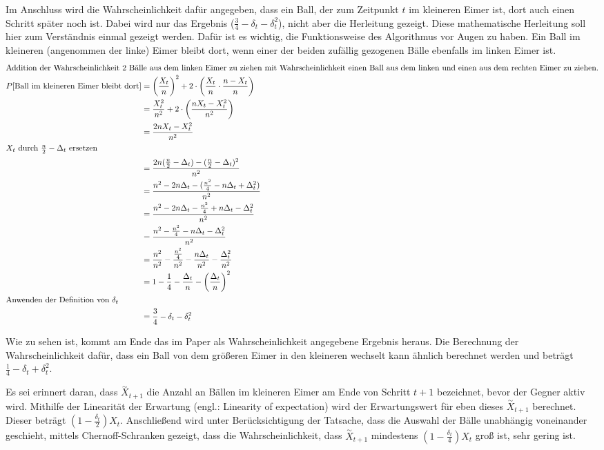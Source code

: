 \documentclass[12pt,ngerman,a4paper]{scrartcl}
\theoremstyle{plain}
\theoremstyle{definition}
\theoremstyle{remark}
\begin{document}
Im Anschluss wird die Wahrscheinlichkeit dafür angegeben, dass ein Ball, der
zum Zeitpunkt $t$ im kleineren Eimer ist, dort auch einen Schritt später noch ist.
Dabei wird nur das Ergebnis ($\frac{3}{4} - \delta_t - \delta_t^2$), nicht aber
die Herleitung gezeigt. Diese mathematische Herleitung soll hier zum Verständnis
einmal gezeigt werden. Dafür ist es wichtig, die Funktionsweise des Algorithmus
vor Augen zu haben. Ein Ball im kleineren (angenommen der linke) Eimer bleibt dort,
wenn einer der beiden zufällig gezogenen Bälle ebenfalls im linken Eimer ist.
\begin{alignat*}{2}
    \intertext{Addition der Wahrscheinlichkeit 2 Bälle aus dem linken
    Eimer zu ziehen mit Wahrscheinlichkeit einen Ball aus dem linken und einen
    aus dem rechten Eimer zu ziehen.}
    P[\text{Ball im kleineren Eimer bleibt dort}] &= \left(\frac{X_t}{n}\right)^2
        + 2 \cdot \left( \frac{X_t}{n} \cdot \frac{n - X_t}{n} \right) \\
        &= \frac{X_t^2}{n^2} + 2 \cdot \left( \frac{nX_t - X_t^2}{n^2} \right) \\
        &= \frac{2nX_t - X_t^2}{n^2} \\
    \intertext{$X_t$ durch $\frac{n}{2} - \Delta_t$ ersetzen}
    &= \frac{2n(\frac{n}{2} - \Delta_t) - (\frac{n}{2} - \Delta_t)^2}{n^2} \\
    &= \frac{n^2 - 2n\Delta_t - (\frac{n^2}{4} - n\Delta_t + \Delta_t^2)}{n^2} \\
    &= \frac{n^2 - 2n\Delta_t - \frac{n^2}{4} + n\Delta_t - \Delta_t^2}{n^2} \\
    &= \frac{n^2 - \frac{n^2}{4} - n\Delta_t - \Delta_t^2}{n^2} \\
    &= \frac{n^2}{n^2} - \frac{\frac{n^2}{4}}{n^2} - \frac{n\Delta_t}{n^2}
        - \frac{\Delta_t^2}{n^2} \\
    &= 1 - \frac{1}{4} - \frac{\Delta_t}{n} - \left(\frac{\Delta_t}{n}\right)^2 \\
    \intertext{Anwenden der Definition von $\delta_t$}
    &= \frac{3}{4} - \delta_t - \delta_t^2
\end{alignat*}

Wie zu sehen ist, kommt am Ende das im Paper als Wahrscheinlichkeit angegebene
Ergebnis heraus. Die Berechnung der Wahrscheinlichkeit dafür, dass ein Ball von
dem größeren Eimer in den kleineren wechselt kann ähnlich berechnet werden und
beträgt $\frac{1}{4} - \delta_t + \delta_t^2$.

Es sei erinnert daran, dass $\overset{\sim}{X}_{t+1}$ die Anzahl an Bällen im
kleineren Eimer am Ende von Schritt $t+1$ bezeichnet, bevor der Gegner aktiv wird.
Mithilfe der Linearität der Erwartung (engl.: Linearity of expectation) wird
der Erwartungswert für eben dieses $\overset{\sim}{X}_{t+1}$ berechnet. Dieser
beträgt $(1 - \frac{\delta_t}{2})X_t$. Anschließend wird unter Berücksichtigung
der Tatsache, dass die Auswahl der Bälle unabhängig voneinander geschieht, mittels
Chernoff-Schranken gezeigt, dass die Wahrscheinlichkeit, dass $\overset{\sim}{X}_{t+1}$
mindestens $(1 - \frac{\delta_t}{4})X_t$ groß ist, sehr gering ist.
\end{document}

